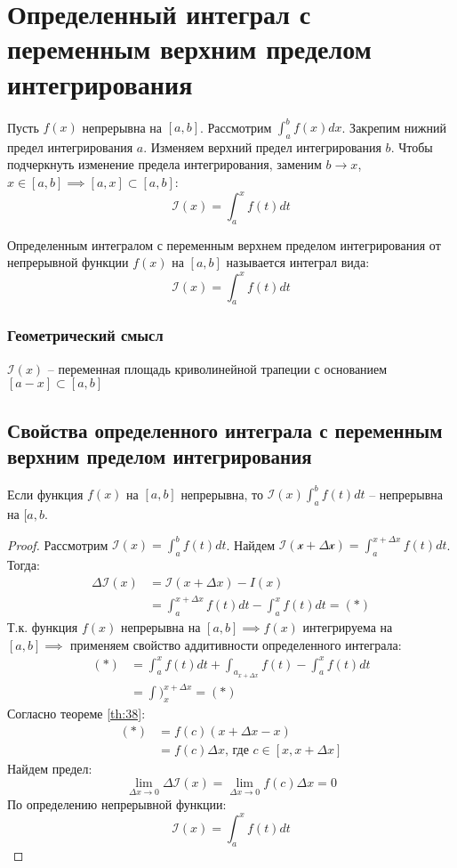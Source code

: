 \section{Определенный интеграл с переменным верхним пределом интегрирования}

Пусть $f(x)$ непрерывна на $[a, b]$. Рассмотрим $\int_a^b f(x) dx$.
Закрепим нижний предел интегрирования $a$. Изменяем верхний предел интегрирования $b$. Чтобы подчеркнуть изменение предела интегрирования, заменим $b \to x$, $x \in [a, b] \implies [a, x] \subset [a, b]$: \[
  \mathcal{I}(x) = \int_a^x f(t) dt
\]

\begin{definition}
  Определенным интегралом с переменным верхнем пределом интегрирования от непрерывной функции $f(x)$ на $[a, b]$ называется интеграл вида: \[
  \mathcal{I}(x) = \int_a^x f(t) dt
  \] 
\end{definition}

\subsubsection*{Геометрический смысл}

$\mathcal{I}(x)$ -- переменная площадь криволинейной трапеции с основанием $[a - x] \subset  [a, b]$

\subsection{Свойства определенного интеграла с переменным верхним пределом интегрирования}

\begin{theorem}[Непрерывность]
  \label{th:41}
  Если функция $f(x)$ на $[a, b]$ непрерывна, то $\mathcal{I}(x) \int_a^b f(t)dt$ -- непрерывна на $[a, b$.
\end{theorem}
\begin{proof}
  Рассмотрим $\mathcal{I}(x) = \int_a^b f(t) dt$.
  Найдем $\mathcal{I(x + \Delta x)} = \int_a^{x + \Delta x} f(t) dt$. Тогда:
  \begin{align*}
    \Delta \mathcal{I}(x) &= \mathcal{I}(x + \Delta x) - I(x) \\
           &= \int_a^{x + \Delta x} f(t) dt - \int_a^x f(t) dt = (*)
  \end{align*}
  Т.к. функция $f(x)$ непрерывна на $[a, b] \implies f(x)$ интегрируема на $[a, b] \implies$ применяем свойство аддитивности определенного интеграла:
  \begin{align*}
    (*) &= \int_a^x f(t) dt + \int_a_{x + \Delta x} f(t) - \int_a^x f(t) dt \\
        &= \int)_x^{x + \Delta x} = (*)
  \end{align*}
  Согласно теореме \ref{th:38}: 
  \begin{align*}
    (*) &= f(c) (x + \Delta x - x) \\
        &= f(c) \Delta x \text{, где } c \in [x, x + \Delta x]
  \end{align*}
  Найдем предел:  \[
    \lim_{\Delta x \to 0} \Delta \mathcal{I}(x) = \lim_{\Delta x \to 0} f(c) \Delta x = 0
  \] 
  По определению непрерывной функции: \[
  \mathcal{I}(x) = \int_a^x f(t) dt
  \] 
\end{proof}

